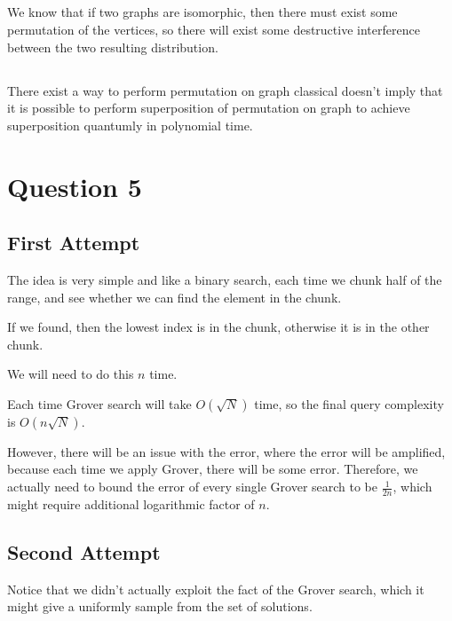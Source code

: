\documentclass{article}
\theoremstyle{definition}
\begin{document}
\subsection{}

We know that if two graphs are isomorphic, then there must exist some permutation of the vertices,
so there will exist some destructive interference between the two resulting distribution.

\subsection{}

There exist a way to perform permutation on graph classical doesn't imply that it is possible
to perform superposition of permutation on graph to achieve superposition quantumly in polynomial time.



\pagebreak

\section{Question 5}

\subsection*{First Attempt}

The idea is very simple and like a binary search, each time we chunk half of the range,
and see whether we can find the element in the chunk.

If we found, then the lowest index is in the chunk, otherwise it is in the other chunk.

We will need to do this $n$ time.

Each time Grover search will take $O(\sqrt{N})$ time,
so the final query complexity is $O(n \sqrt{N})$.

However, there will be an issue with the error, where the error will be amplified,
because each time we apply Grover, there will be some error. Therefore, we actually
need to bound the error of every single Grover search to be \(\frac{1}{2n}\), which
might require additional logarithmic factor of \(n\).

\subsection*{Second Attempt}

Notice that we didn't actually exploit the fact of the Grover search,
which it might give a uniformly sample from the set of solutions.
\end{document}
